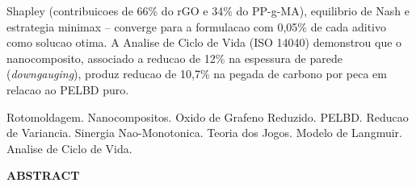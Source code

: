 \documentclass[11pt,a4paper,oneside]{article}
\begin{document}
Shapley (contribuicoes de 66\% do rGO e 34\% do PP-g-MA), equilibrio de Nash e estrategia minimax -- converge para a formulacao com 0,05\% de cada aditivo como solucao otima. A Analise de Ciclo de Vida (ISO 14040) demonstrou que o nanocomposito, associado a reducao de 12\% na espessura de parede (\textit{downgauging}), produz reducao de 10,7\% na pegada de carbono por peca em relacao ao PELBD puro.

\vspace{3pt}{\bfseries Palavras-chave:} Rotomoldagem. Nanocompositos. Oxido de Grafeno Reduzido. PELBD. Reducao de Variancia. Sinergia Nao-Monotonica. Teoria dos Jogos. Modelo de Langmuir. Analise de Ciclo de Vida.

\newpage
\begin{center}{\large\bfseries ABSTRACT}\end{center}\vspace{6pt}\footnotesize
\end{document}
